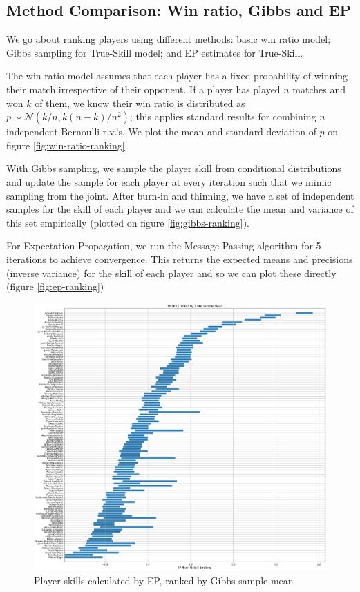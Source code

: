 \documentclass[]{article}
\newcommand{\Ncal}{\mathcal{N}}
\begin{document}
\clearpage
\subsection{Method Comparison: Win ratio, Gibbs and EP}

We go about ranking players using different methods: basic win ratio model; Gibbs sampling for True-Skill model; and EP estimates for True-Skill.

The win ratio model assumes that each player has a fixed probability of winning their match irrespective of their opponent. If a player has played $n$ matches and won $k$ of them, we know their win ratio is distributed as $p \sim \Ncal(k/n, k(n-k)/n^2)$; this applies standard results for combining $n$ independent Bernoulli r.v.'s. We plot the mean and standard deviation of $p$ on figure \ref{fig:win-ratio-ranking}.

With Gibbs sampling, we sample the player skill from conditional distributions and update the sample for each player at every iteration such that we mimic sampling from the joint. After burn-in and thinning, we have a set of independent samples for the skill of each player and we can calculate the mean and variance of this set empirically (plotted on figure \ref{fig:gibbs-ranking}).

For Expectation Propagation, we run the Message Passing algorithm for 5 iterations to achieve convergence. This returns the expected means and precisions (inverse variance) for the skill of each player and so we can plot these directly (figure \ref{fig:ep-ranking})

\begin{figure}[!h]
	\centering
	\includegraphics[width=\linewidth]{ep-skills-by-gibbs.png}
	\caption{Player skills calculated by EP, ranked by Gibbs sample mean}
	\label{fig:ep-by-gibbs}
\end{figure}
\end{document}
